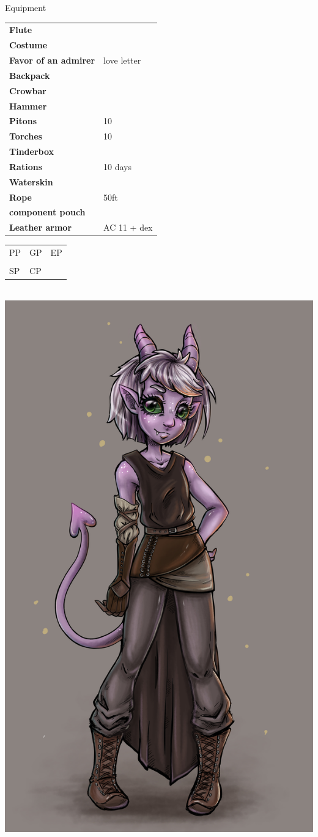 \documentclass[a4paper,10pt,bg=print]{dndbook} %
\def\Equipment{
	\begin{tabularx}{\textwidth}{lX}
		\textbf{Flute}&\\
		\textbf{Costume}&\\
		\textbf{Favor of an admirer} & love letter\\
		\textbf{Backpack}&\\
		\textbf{Crowbar}&\\
		\textbf{Hammer}&\\
		\textbf{Pitons}& 10\\
		\textbf{Torches}& 10\\
		\textbf{Tinderbox}&\\
		\textbf{Rations}& 10 days\\
		\textbf{Waterskin}&\\
		\textbf{Rope}& 50ft\\
		\textbf{component pouch}&\\
		\textbf{Leather armor} & AC 11 + dex
		
	\end{tabularx}
}
\begin{document}
	\begin{minipage}[t][\textheight]{.5\linewidth}\normalsize
		{\LARGE Equipment}\\
		\Equipment
	\end{minipage}%
	\begin{minipage}[t][\textheight]{.5\linewidth}\normalsize
		\begin{tabularx}{\textwidth}{XXX}
			&&\\\hline
			\tiny{PP}&\tiny{GP}	&\tiny{EP}\\
			&&\\\hline
			\tiny{SP}& \tiny{CP}&
		\end{tabularx}\vspace*{.25cm}\\
		\includegraphics[width=\linewidth]{Character.png}\vspace*{.25cm}\\

\end{minipage}
\end{document}

